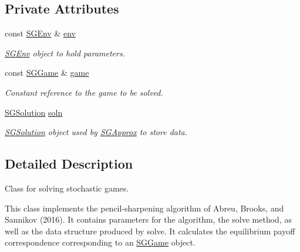 \subsection*{Private Attributes}
\begin{DoxyCompactItemize}
\item 
\mbox{\label{classSGSolver_a7a4fded3697541a40dbbab06f733e648}} 
const \hyperlink{classSGEnv}{S\+G\+Env} \& \hyperlink{classSGSolver_a7a4fded3697541a40dbbab06f733e648}{env}
\begin{DoxyCompactList}\small\item\em \hyperlink{classSGEnv}{S\+G\+Env} object to hold parameters. \end{DoxyCompactList}\item 
\mbox{\label{classSGSolver_ad9b23110fabeeb58f19729017d56c792}} 
const \hyperlink{classSGGame}{S\+G\+Game} \& \hyperlink{classSGSolver_ad9b23110fabeeb58f19729017d56c792}{game}
\begin{DoxyCompactList}\small\item\em Constant reference to the game to be solved. \end{DoxyCompactList}\item 
\mbox{\label{classSGSolver_ac2b29f9d4f8a5fde16e07c68c349367c}} 
\hyperlink{classSGSolution}{S\+G\+Solution} \hyperlink{classSGSolver_ac2b29f9d4f8a5fde16e07c68c349367c}{soln}
\begin{DoxyCompactList}\small\item\em \hyperlink{classSGSolution}{S\+G\+Solution} object used by \hyperlink{classSGApprox}{S\+G\+Approx} to store data. \end{DoxyCompactList}\end{DoxyCompactItemize}


\subsection{Detailed Description}
Class for solving stochastic games. 

This class implements the pencil-\/sharpening algorithm of Abreu, Brooks, and Sannikov (2016). It contains parameters for the algorithm, the solve method, as well as the data structure produced by solve. It calculates the equilibrium payoff correspondence corresponding to an \hyperlink{classSGGame}{S\+G\+Game} object. 

